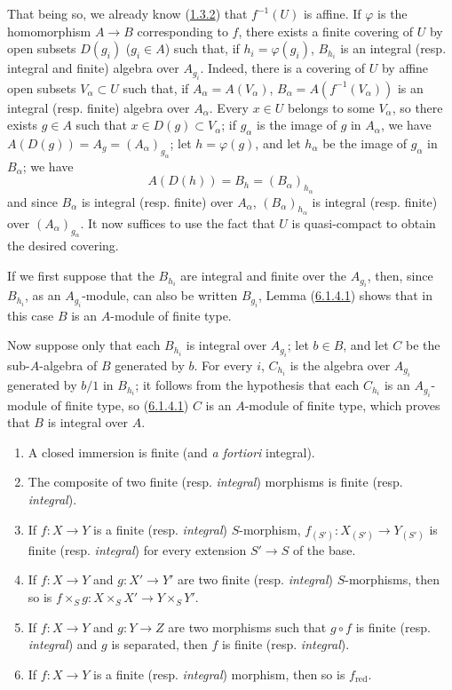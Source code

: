 That being so, we already know (\hyperref[II.1.3.2]{1.3.2}) that
$f^{-1}(U)$ is affine. If $\varphi$ is the homomorphism $A\to B$
corresponding to $f$, there exists a finite covering of $U$ by open subsets
$D(g_i)$ ($g_i\in A$) such that, if $h_i=\varphi(g_i)$, $B_{h_i}$ is an
integral (resp. integral and finite) algebra over $A_{g_i}$. Indeed, there
is a covering of $U$ by affine open subsets $V_\alpha\subset U$ such that, if
$A_\alpha=A(V_\alpha)$, $B_\alpha=A(f^{-1}(V_\alpha))$ is an integral (resp.
finite) algebra over $A_\alpha$. Every $x\in U$ belongs to some
$V_\alpha$, so there exists $g\in A$ such that $x\in D(g)\subset V_\alpha$;
if $g_\alpha$ is the image of $g$ in $A_\alpha$, we have
$A(D(g))=A_g=(A_\alpha)_{g_\alpha}$; let $h=\varphi(g)$, and let $h_\alpha$
be the image of $g_\alpha$ in $B_\alpha$; we have
\[
A(D(h))=B_h=(B_\alpha)_{h_\alpha}
\]
and since $B_\alpha$ is integral (resp. finite) over $A_\alpha$,
$(B_\alpha)_{h_\alpha}$ is integral (resp. finite) over
$(A_\alpha)_{g_\alpha}$. It now suffices to use the fact that $U$ is
quasi-compact to obtain the desired covering.

If we first suppose that the $B_{h_i}$ are integral and finite over the
$A_{g_i}$, then, since $B_{h_i}$, as an $A_{g_i}$-module, can also be
written $B_{g_i}$, Lemma (\hyperref[II.6.1.4.1]{6.1.4.1}) shows that in
this case $B$ is an $A$-module of finite type.

Now suppose only that each $B_{h_i}$ is integral over $A_{g_i}$; let
$b\in B$, and let $C$ be the sub-$A$-algebra of $B$ generated by $b$. For
every $i$, $C_{h_i}$ is the algebra over $A_{g_i}$ generated by $b/1$ in
$B_{h_i}$; it follows from the hypothesis that each $C_{h_i}$ is an
$A_{g_i}$-module of finite type, so
(\hyperref[II.6.1.4.1]{6.1.4.1}) $C$ is an $A$-module of finite type,
which proves that $B$ is integral over $A$.

\begin{proposition}[6.1.5]
\label{II.6.1.5}
\begin{enumerate}
\item[\textup{(i)}] A closed immersion is finite (and \emph{a fortiori} integral).
\item[\textup{(ii)}] The composite of two finite \textup{(resp. \emph{integral})} morphisms is finite
\textup{(resp. \emph{integral})}.
\item[\textup{(iii)}] If $f:X\to Y$ is a finite \textup{(resp. \emph{integral})} $S$-morphism,
$f_{(S')}:X_{(S')}\to Y_{(S')}$ is finite \textup{(resp. \emph{integral})} for every
extension $S'\to S$ of the base.
\item[\textup{(iv)}] If $f:X\to Y$ and $g:X'\to Y'$ are two finite \textup{(resp. \emph{integral})}
$S$-morphisms, then so is
$f\times_S g:X\times_S X'\to Y\times_S Y'$.
\item[\textup{(v)}] If $f:X\to Y$ and $g:Y\to Z$ are two morphisms such that $g\circ
f$ is finite \textup{(resp. \emph{integral})} and $g$ is separated, then $f$ is finite
\textup{(resp. \emph{integral})}.
\item[\textup{(vi)}] If $f:X\to Y$ is a finite \textup{(resp. \emph{integral})} morphism, then so is
$f_{\mathrm{red}}$.
\end{enumerate}
\end{proposition}

